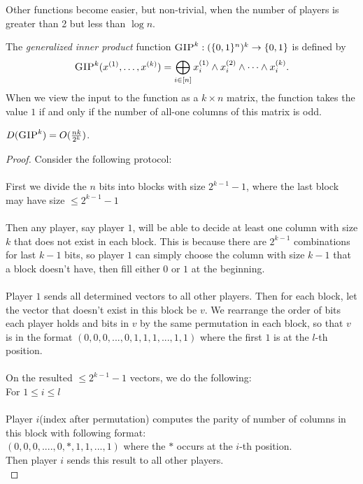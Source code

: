 Other functions become easier, but non-trivial, when the number of players is greater than 2 but less than $\log n$.

The \emph{generalized inner product} function $\textsc{GIP}^k : (\{0,1\}^n)^k \to \{0,1\}$ is defined by
\[
\textsc{GIP}^k(x^{(1)},\ldots,x^{(k)}) = \bigoplus_{i \in [n]} x^{(1)}_i \wedge x^{(2)}_i \wedge \cdots \wedge x^{(k)}_i.
\]
When we view the input to the function as a $k \times n$ matrix, the function takes the value $1$ if and only if the number of all-one columns of this matrix is odd. 

\begin{theorem}
	$D(\textsc{GIP}^k) = O(\frac{nk}{2^k})$.
\end{theorem}

\begin{proof}
	Consider the following protocol:\\
	\\
	First we divide the $n$ bits into blocks with size $2^{k-1}-1$, where the last block may have size $
	\leq 2^{k-1}-1$\\
	\\
	Then any player, say player $1$, will be able to decide at least one column with size $k$ that does not exist in each block.
	This is because there are $2^{k-1}$ combinations for last $k-1$ bits, so player $1$ can simply choose the column with size $k-1$ that a block doesn't have, then fill either $0$ or $1$ at the beginning.\\
	\\
	Player $1$ sends all determined vectors to all other players. Then for each block, let the vector that doesn't exist in this block be $v$. We rearrange the order of bits each player holds and bits in $v$ by the same permutation in each block, so that $v$ is in the format $(0,0,0,...,0,1,1,1,...,1,1)$ where the first $1$ is at the $l$-th position.\\
	\\
	On the resulted $\leq 2^{k-1}-1$ vectors, we do the following:\\
	For $1 \leq i \leq l$\\
	\\
	\hspace*{10mm}Player $i$(index after permutation) computes the parity of number of columns in this block with following format:\\
	\hspace*{20mm}$(0,0,0,....,0,*,1,1,...,1)$ where the $*$ occurs at the $i$-th position.\\
	\hspace*{10mm}Then player $i$ sends this result to all other players.\\

\end{proof}

